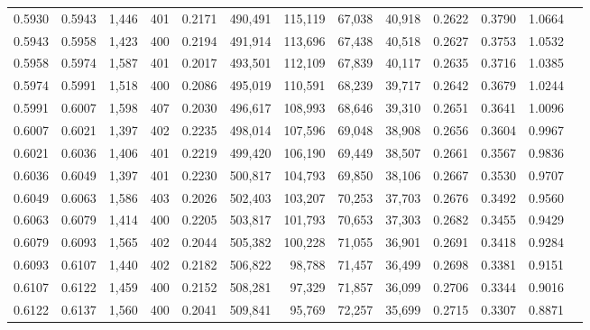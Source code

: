 \begin{tabular}{rrrrrrrrrrrrr}
0.5930 & 0.5943 &  1,446 & 401 &                                     0.2171 & 490,491 & 115,119 &  67,038 &  40,918 & 0.2622 & 0.3790 & 1.0664 \\
0.5943 & 0.5958 &  1,423 & 400 &                                     0.2194 & 491,914 & 113,696 &  67,438 &  40,518 & 0.2627 & 0.3753 & 1.0532 \\
0.5958 & 0.5974 &  1,587 & 401 &                                     0.2017 & 493,501 & 112,109 &  67,839 &  40,117 & 0.2635 & 0.3716 & 1.0385 \\
0.5974 & 0.5991 &  1,518 & 400 &                                     0.2086 & 495,019 & 110,591 &  68,239 &  39,717 & 0.2642 & 0.3679 & 1.0244 \\
0.5991 & 0.6007 &  1,598 & 407 &                                     0.2030 & 496,617 & 108,993 &  68,646 &  39,310 & 0.2651 & 0.3641 & 1.0096 \\
0.6007 & 0.6021 &  1,397 & 402 &                                     0.2235 & 498,014 & 107,596 &  69,048 &  38,908 & 0.2656 & 0.3604 & 0.9967 \\
0.6021 & 0.6036 &  1,406 & 401 &                                     0.2219 & 499,420 & 106,190 &  69,449 &  38,507 & 0.2661 & 0.3567 & 0.9836 \\
0.6036 & 0.6049 &  1,397 & 401 &                                     0.2230 & 500,817 & 104,793 &  69,850 &  38,106 & 0.2667 & 0.3530 & 0.9707 \\
0.6049 & 0.6063 &  1,586 & 403 &                                     0.2026 & 502,403 & 103,207 &  70,253 &  37,703 & 0.2676 & 0.3492 & 0.9560 \\
0.6063 & 0.6079 &  1,414 & 400 &                                     0.2205 & 503,817 & 101,793 &  70,653 &  37,303 & 0.2682 & 0.3455 & 0.9429 \\
0.6079 & 0.6093 &  1,565 & 402 &                                     0.2044 & 505,382 & 100,228 &  71,055 &  36,901 & 0.2691 & 0.3418 & 0.9284 \\
0.6093 & 0.6107 &  1,440 & 402 &                                     0.2182 & 506,822 &  98,788 &  71,457 &  36,499 & 0.2698 & 0.3381 & 0.9151 \\
0.6107 & 0.6122 &  1,459 & 400 &                                     0.2152 & 508,281 &  97,329 &  71,857 &  36,099 & 0.2706 & 0.3344 & 0.9016 \\
0.6122 & 0.6137 &  1,560 & 400 &                                     0.2041 & 509,841 &  95,769 &  72,257 &  35,699 & 0.2715 & 0.3307 & 0.8871 \\

\end{tabular}
